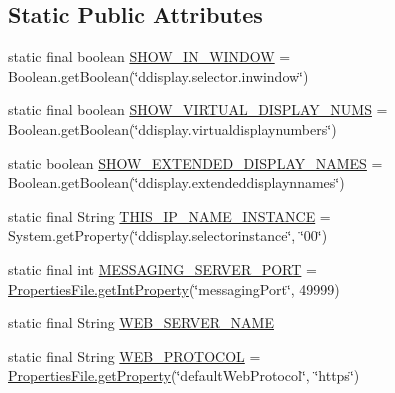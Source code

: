 \subsection*{Static Public Attributes}
\begin{DoxyCompactItemize}
\item 
static final boolean \hyperlink{classgov_1_1fnal_1_1ppd_1_1dd_1_1GlobalVariables_af0e7b37c8bf6495b999b93ed0f4f1c76}{S\-H\-O\-W\-\_\-\-I\-N\-\_\-\-W\-I\-N\-D\-O\-W} = Boolean.\-get\-Boolean(\char`\"{}ddisplay.\-selector.\-inwindow\char`\"{})
\item 
static final boolean \hyperlink{classgov_1_1fnal_1_1ppd_1_1dd_1_1GlobalVariables_a7ccfa5abda77efe03cd888f14d4171a3}{S\-H\-O\-W\-\_\-\-V\-I\-R\-T\-U\-A\-L\-\_\-\-D\-I\-S\-P\-L\-A\-Y\-\_\-\-N\-U\-M\-S} = Boolean.\-get\-Boolean(\char`\"{}ddisplay.\-virtualdisplaynumbers\char`\"{})
\item 
static boolean \hyperlink{classgov_1_1fnal_1_1ppd_1_1dd_1_1GlobalVariables_a24c624ba470a455c7ed0c43d72a9f417}{S\-H\-O\-W\-\_\-\-E\-X\-T\-E\-N\-D\-E\-D\-\_\-\-D\-I\-S\-P\-L\-A\-Y\-\_\-\-N\-A\-M\-E\-S} = Boolean.\-get\-Boolean(\char`\"{}ddisplay.\-extendeddisplaynnames\char`\"{})
\item 
static final String \hyperlink{classgov_1_1fnal_1_1ppd_1_1dd_1_1GlobalVariables_ae5fe9c75fedaa742e5f68baad8768d7f}{T\-H\-I\-S\-\_\-\-I\-P\-\_\-\-N\-A\-M\-E\-\_\-\-I\-N\-S\-T\-A\-N\-C\-E} = System.\-get\-Property(\char`\"{}ddisplay.\-selectorinstance\char`\"{}, \char`\"{}00\char`\"{})
\item 
static final int \hyperlink{classgov_1_1fnal_1_1ppd_1_1dd_1_1GlobalVariables_a3afb8f4fd1dbbc82329ea9ff4aa3629e}{M\-E\-S\-S\-A\-G\-I\-N\-G\-\_\-\-S\-E\-R\-V\-E\-R\-\_\-\-P\-O\-R\-T} = \hyperlink{classgov_1_1fnal_1_1ppd_1_1dd_1_1util_1_1nonguiUtils_1_1PropertiesFile_a5ed1fc6f67450475cdff0256ca4d6aad}{Properties\-File.\-get\-Int\-Property}(\char`\"{}messaging\-Port\char`\"{}, 49999)
\item 
static final String \hyperlink{classgov_1_1fnal_1_1ppd_1_1dd_1_1GlobalVariables_af5ffb15826513fabba402ec017edbc70}{W\-E\-B\-\_\-\-S\-E\-R\-V\-E\-R\-\_\-\-N\-A\-M\-E}
\item 
static final String \hyperlink{classgov_1_1fnal_1_1ppd_1_1dd_1_1GlobalVariables_aa3bf05d555f0c3489c60664ae54a2480}{W\-E\-B\-\_\-\-P\-R\-O\-T\-O\-C\-O\-L} = \hyperlink{classgov_1_1fnal_1_1ppd_1_1dd_1_1util_1_1nonguiUtils_1_1PropertiesFile_ad3e5ac77723df18cb845643e3e219f49}{Properties\-File.\-get\-Property}(\char`\"{}default\-Web\-Protocol\char`\"{}, \char`\"{}https\char`\"{})

\end{DoxyCompactItemize}
